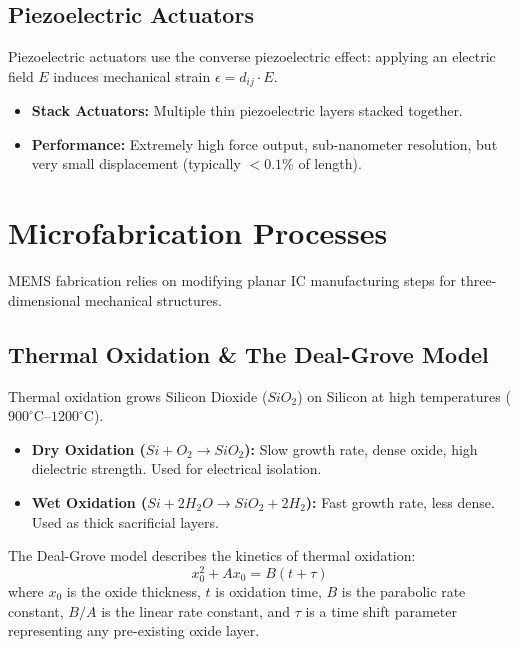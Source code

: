 \documentclass[12pt,a4paper]{article}
\begin{document}
\subsection{Piezoelectric Actuators}
Piezoelectric actuators use the converse piezoelectric effect: applying an electric field $E$ induces mechanical strain $\epsilon = d_{ij} \cdot E$.
\begin{itemize}[leftmargin=*]
  \item \textbf{Stack Actuators:} Multiple thin piezoelectric layers stacked together.
  \item \textbf{Performance:} Extremely high force output, sub-nanometer resolution, but very small displacement (typically $< 0.1\%$ of length).
\end{itemize}

\section{Microfabrication Processes}

MEMS fabrication relies on modifying planar IC manufacturing steps for three-dimensional mechanical structures.

\subsection{Thermal Oxidation \& The Deal-Grove Model}
Thermal oxidation grows Silicon Dioxide ($SiO_2$) on Silicon at high temperatures ($900^{\circ}\text{C}$--$1200^{\circ}\text{C}$).
\begin{itemize}[leftmargin=*, itemsep=3.5pt]
  \item \textbf{Dry Oxidation ($Si + O_2 \to SiO_2$):} Slow growth rate, dense oxide, high dielectric strength. Used for electrical isolation.
  \item \textbf{Wet Oxidation ($Si + 2H_2O \to SiO_2 + 2H_2$):} Fast growth rate, less dense. Used as thick sacrificial layers.
\end{itemize}

\begin{tcolorbox}[defbox, title={The Deal-Grove Model}]
The Deal-Grove model describes the kinetics of thermal oxidation:
$$x_0^2 + A x_0 = B(t + \tau)$$
where $x_0$ is the oxide thickness, $t$ is oxidation time, $B$ is the parabolic rate constant, $B/A$ is the linear rate constant, and $\tau$ is a time shift parameter representing any pre-existing oxide layer.
\end{tcolorbox}
\end{document}
